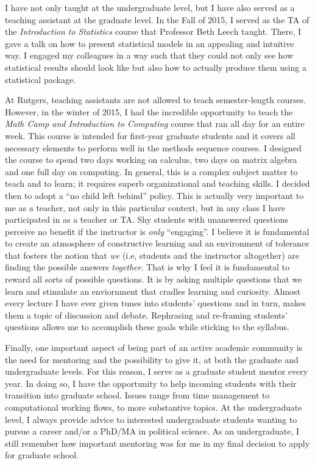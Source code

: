 \documentclass[11pt]{letter} %
\begin{document}
\begin{letter}{}
I have not only taught at the undergraduate level, but I have also served as a teaching assistant at the graduate level. In the Fall of 2015, I served as the TA of the \emph{Introduction to Statistics} course that Professor Beth Leech taught. There, I gave a talk on how to present statistical models in an appealing and intuitive way. I engaged my colleagues in a way such that they could not only see how statistical results should look like but also how to actually produce them using a statistical package. 

At Rutgers, teaching assistants are not allowed to teach semester-length courses. However, in the winter of 2015, I had the incredible opportunity to teach the \emph{Math Camp and Introduction to Computing} course that ran all day for an entire week. This course is intended for first-year graduate students and it covers all necessary elements to perform well in the methods sequence courses. I designed the course to spend two days working on calculus, two days on matrix algebra and one full day on computing. In general, this is a complex subject matter to teach and to learn; it requires superb organizational and teaching skills. I decided then to adopt a ``no child left behind'' policy. This is actually very important to me as a teacher, not only in this particular context, but in any class I have participated in as a teacher or TA. Shy students with unanswered questions perceive no benefit if the instructor is \emph{only} ``engaging''. I believe it is fundamental to create an atmosphere of constructive learning and an environment of tolerance that fosters the notion that \emph{we} (i.e, students and the instructor altogether) are finding the possible answers \emph{together}. That is why I feel it is fundamental to reward all sorts of possible questions. It is by asking multiple questions that we learn and stimulate an enviornment that cradles learning and curiosity. Almost every lecture I have ever given tunes into students' questions and in turn, makes them a topic of discussion and debate. Rephrasing and re-framing students' questions allows me to accomplish these goals while sticking to the syllabus. 

Finally, one important aspect of being part of an active academic community is the need for mentoring and the possibility to give it, at both the graduate and undergraduate levels. For this reason, I serve as a graduate student mentor every year. In doing so, I have the opportunity to help incoming students with their transition into graduate school. Issues range from time management to computational working flows, to more substantive topics. At the undergraduate level, I always provide advice to interested undergraduate students wanting to pursue a career and/or a PhD/MA in political science. As an undergraduate, I still remember how important mentoring was for me in my final decision to apply for graduate school.


\end{letter}
\end{document}
